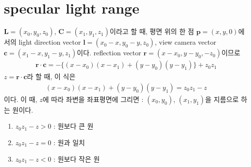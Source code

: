 \documentclass[11pt]{article}
\begin{document}
\thispagestyle{empty}
\section{specular light range}
$\mathbf{L}=\left(x_{0},y_{0},z_{0}\right)$, $\mathbf{C}=\left(x_{1},y_{1},z_{1}\right)$이라고 할 때, 평면 위의 한 점 $\mathbf{p}=\left(x,y,0\right)$에서의 light direction vector $\mathbf{l}=\left(x_{0}-x,y_{0}-y,z_{0}\right)$, view camera vector $\mathbf{c}=\left(x_{1}-x,y_{1}-y,z_{1}\right)$이다. reflection vector $\mathbf{r}=\left(x-x_{0},y-y_{0},-z_{0}\right)$이므로 
\begin{align}
\mathbf{r}\cdot \mathbf{c}=- \big\{\left(x-x_{0}\right)\left(x-x_{1}\right)+\left(y-y_{0}\right)\left(y-y_{1}\right) \big\} +z_{0}z_{1}
\end{align}
$z=\mathbf{r}\cdot \mathbf{c}$라 할 때, 이 식은 
\begin{align}
\left(x-x_{0}\right)\left(x-x_{1}\right)+\left(y-y_{0}\right)\left(y-y_{1}\right)=z_{0}z_{1}-z
\end{align}
이다. 이 때, $z$에 따라 좌변을 좌표평면에 그리면 : $\left(x_{0},y_{0}\right)$, $\left(x_{1},y_{1}\right)$을 지름으로 하는 원이다.
\begin{enumerate}
\item $z_{0}z_{1}-z>0$ : 원보다 큰 원
\item $z_{0}z_{1}-z=0$ : 원과 일치
\item $z_{0}z_{1}-z<0$ : 원보다 작은 원



\end{enumerate}
\end{document}
